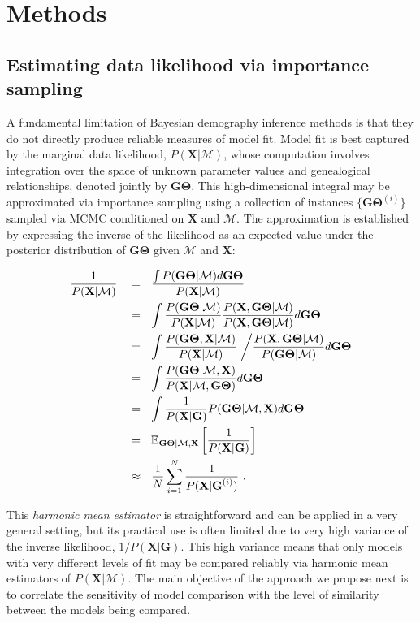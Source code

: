 \documentclass[11pt]{article}
\newcommand{\vect}[1]{\boldsymbol{\mathbf{#1}}}
\newcommand{\E}{\mathbb{E}}
\newcommand{\X}{\vect{X}}
\newcommand{\M}{\mathcal{M}}
\newcommand{\G}{\vect{G}}
\newcommand{\T}{\vect{\Theta}}
\newcommand{\GT}{\G\T}
\newcommand{\1}{\mathbbm{1}}
\begin{document}
\section{Methods}


\subsection{Estimating data likelihood via importance sampling}

A fundamental limitation of Bayesian demography inference methods is that they do not directly produce reliable measures of model fit.
%
Model fit is best captured by the marginal data likelihood, $P(\X|\M)$, whose computation involves integration over the space of unknown parameter values and genealogical relationships,
denoted jointly by $\GT$.
%
This high-dimensional integral may be approximated via importance sampling using a collection of instances $\{\GT^{(i)}\}$ sampled via MCMC conditioned on $\X$ and $\M$.
%
The approximation is established by expressing the inverse of the likelihood as an expected value under the posterior distribution of $\GT$ given $\M$ and $\X$:
%
%
\begin{small}
\begin{align}
\frac{1}{P(\X|\M)} ~~~
&=~~ \frac{\int P(\GT|\M)d\GT}{P(\X|\M)} \notag \\ %
&=~~ \int \frac{P(\GT|\M)}{P(\X|\M)} \frac{P(\X,\GT|\M)}{P(\X,\GT|\M)}  d\GT \notag \\ %
&=~~ \int \frac{P(\GT,\X |\M)}{P(\X|\M)} ~\bigg/ \frac{P(\X,\GT|\M)}{P(\GT|\M)}  d\GT \notag \\ %
&=~~ \int \frac{P(\GT|\M,\X)}{P(\X|\M,\GT)} d\GT \notag \\ %
&=~~ \int \frac{1}{P(\X|\G)}P(\GT|\M,\X) d\GT  \notag \\ %
&=~~ \E_{\GT|\M,\X } \left[\frac{1}{P(\X|\G)}\right] \notag\\  %
&\approx~~ \frac{1}{N} \sum_{i=1}^{N}\frac{1}{P(\X|\G^{(i)})} ~. \label{eq:harmonic}
\end{align}
\end{small}

This {\em harmonic mean estimator} is straightforward and can be applied in a very general setting, but its practical use is often limited due to very high variance
of the inverse likelihood, $1/P(\X|\G)$.
%
This high variance means that only models with very different levels of fit may be compared reliably via harmonic mean estimators of $P(\X|\M)$.
%
The main objective of the approach we propose next is to correlate the sensitivity of model comparison with the level of similarity between the models being compared.
%
\end{document}
